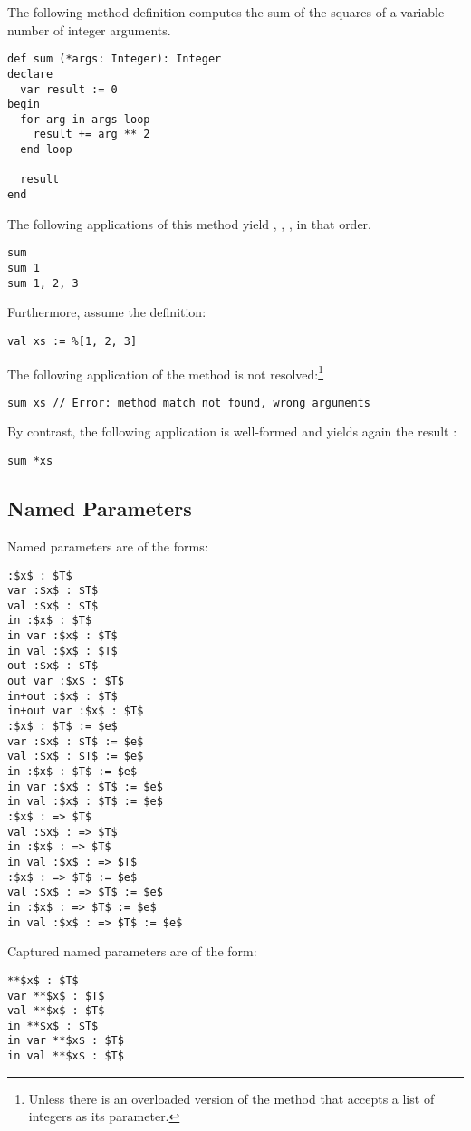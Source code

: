 \example The following method definition computes the sum of the squares of a variable number of integer arguments.
\begin{lstlisting}
def sum (*args: Integer): Integer
declare
  var result := 0
begin
  for arg in args loop
    result += arg ** 2
  end loop
  
  result
end
\end{lstlisting}
The following applications of this method yield , , , in that order.
\begin{lstlisting}
sum
sum 1
sum 1, 2, 3
\end{lstlisting}
Furthermore, assume the definition:
\begin{lstlisting}
val xs := %[1, 2, 3]
\end{lstlisting}
The following application of the method  is not resolved:\footnote{Unless there is an overloaded version of the method that accepts a list of integers as its parameter.}
\begin{lstlisting}
sum xs // Error: method match not found, wrong arguments
\end{lstlisting}
By contrast, the following application is well-formed and yields again the result :
\begin{lstlisting}
sum *xs
\end{lstlisting}

\subsection{Named Parameters}
\label{sec:named-parameters}
\label{sec:captured-named-parameters}

Named parameters are of the forms:
\begin{lstlisting}
:$x$ : $T$
var :$x$ : $T$
val :$x$ : $T$
in :$x$ : $T$
in var :$x$ : $T$
in val :$x$ : $T$
out :$x$ : $T$
out var :$x$ : $T$
in+out :$x$ : $T$
in+out var :$x$ : $T$
:$x$ : $T$ := $e$
var :$x$ : $T$ := $e$
val :$x$ : $T$ := $e$
in :$x$ : $T$ := $e$
in var :$x$ : $T$ := $e$
in val :$x$ : $T$ := $e$
:$x$ : => $T$
val :$x$ : => $T$
in :$x$ : => $T$
in val :$x$ : => $T$
:$x$ : => $T$ := $e$
val :$x$ : => $T$ := $e$
in :$x$ : => $T$ := $e$
in val :$x$ : => $T$ := $e$
\end{lstlisting}

Captured named parameters are of the form: 
\begin{lstlisting}
**$x$ : $T$
var **$x$ : $T$
val **$x$ : $T$
in **$x$ : $T$
in var **$x$ : $T$
in val **$x$ : $T$
\end{lstlisting}

